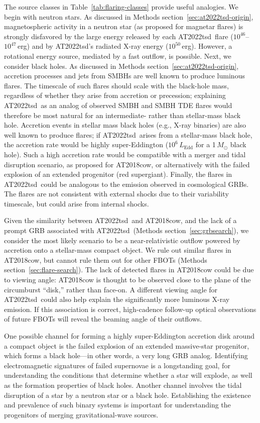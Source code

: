 \documentclass{nature_plusfigure}
\newcommand{\at}{AT2022tsd}
\begin{document}
The source classes in Table~\ref{tab:flaring-classes} provide useful analogies. We begin with neutron stars. As discussed in Methods section~\ref{sec:at2022tsd-origin}, magnetospheric activity in a neutron star (as proposed for magnetar flares) is strongly disfavored by the large energy released by each \at\ flare ($10^{46}$--$10^{47}$\,erg) and by \at's radiated X-ray energy ($10^{50}$\,erg).
However, a rotational energy source, mediated by a fast outflow, is possible.
Next, we consider black holes. As discussed in Methods section~\ref{sec:at2022tsd-origin}, accretion processes and jets from SMBHs are well known to produce luminous flares. The timescale of such flares should scale with the black-hole mass, regardless of whether they arise from accretion or precession; explaining \at\ as an analog of observed SMBH and SMBH TDE flares would therefore be most natural for an intermediate- rather than stellar-mass black hole.
Accretion events in stellar mass black holes (e.g., X-ray binaries) are also well known to produce flares; if \at\ arises from a stellar-mass black hole, the accretion rate would be highly super-Eddington ($10^{6}\,L_\mathrm{Edd}$ for a 1\,$M_\odot$ black hole). Such a high accretion rate would be compatible with a merger and tidal disruption scenario, as proposed for AT2018cow\cite{Metzger2022}, or alternatively with the failed explosion of an extended progenitor\cite{Quataert2012} (red supergiant).
Finally, the flares in \at\ could be analogous to the emission observed in cosmological GRBs. The flares are not consistent with external shocks due to their variability timescale, but could arise from internal shocks.

Given the similarity between \at\ and AT2018cow, and the lack of a prompt GRB associated with \at\ (Methods section~\ref{sec:grbsearch}), we consider the most likely scenario to be a near-relativistic outflow powered by accretion onto a stellar-mass compact object.
We rule out similar flares in AT2018cow, but cannot rule them out for other FBOTs (Methods section~\ref{sec:flare-search}).
The lack of detected flares in AT2018cow could be due to viewing angle: AT2018cow is thought to be observed close to the plane of the circumburst ``disk,'' rather than face-on\cite{Margutti2019,Chen2023}. A different viewing angle for \at\ could also help explain the significantly more luminous X-ray emission.
If this association is correct, high-cadence follow-up optical observations of future FBOTs will reveal the beaming angle of their outflows.

One possible channel for forming a highly super-Eddington accretion disk around a compact object is the failed explosion of an extended massive-star progenitor, which forms a black hole\cite{Woosley1993,Kashiyama2015,Quataert2019}---in other words, a very long GRB analog\cite{Quataert2012}.
Identifying electromagnetic signatures of failed supernovae is a longstanding goal, for understanding the conditions that determine whether a star will explode, as well as the formation properties of black holes.
Another channel involves the tidal disruption of a star by a neutron star or a black hole\cite{Metzger2022}.
Establishing the existence and prevalence of such binary systems is important for understanding the progenitors of merging gravitational-wave sources.
\end{document}
